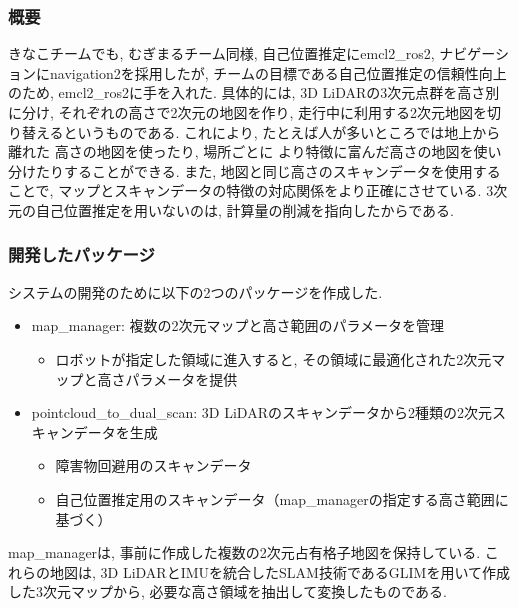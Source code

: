 \subsubsection{概要}
きなこチームでも, むぎまるチーム同様, 
自己位置推定にemcl2\_ros2, ナビゲーションにnavigation2を採用したが, 
チームの目標である自己位置推定の信頼性向上のため, 
emcl2\_ros2に手を入れた. 
具体的には, 3D LiDARの3次元点群を高さ別に分け, 
それぞれの高さで2次元の地図を作り, 
走行中に利用する2次元地図を切り替えるというものである. 
これにより, たとえば人が多いところでは地上から離れた
高さの地図を使ったり, 場所ごとに
より特徴に富んだ高さの地図を使い分けたりすることができる. 
また, 地図と同じ高さのスキャンデータを使用することで, 
マップとスキャンデータの特徴の対応関係をより正確にさせている. 
3次元の自己位置推定を用いないのは, 
計算量の削減を指向したからである. 



\subsubsection{開発したパッケージ}
システムの開発のために以下の2つのパッケージを作成した. 

\begin{itemize}
  \item map\_manager: 複数の2次元マップと高さ範囲のパラメータを管理
    \begin{itemize}
      \item ロボットが指定した領域に進入すると, その領域に最適化された2次元マップと高さパラメータを提供
    \end{itemize}
  \item pointcloud\_to\_dual\_scan: 3D LiDARのスキャンデータから2種類の2次元スキャンデータを生成
        \begin{itemize}
          \item 障害物回避用のスキャンデータ
          \item 自己位置推定用のスキャンデータ（map\_managerの指定する高さ範囲に基づく）
        \end{itemize}
\end{itemize}
map\_managerは, 事前に作成した複数の2次元占有格子地図を保持している. 
これらの地図は, 3D LiDARとIMUを統合したSLAM技術であるGLIM\cite{glim}を用いて作成した3次元マップから, 必要な高さ領域を抽出して変換したものである. 

